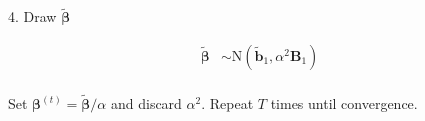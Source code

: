 \documentclass[11pt,a4paper]{article}
\begin{document}
\begin{center}
{\begin{minipage}{12cm}
4. Draw $\bm{\tilde{\beta}}$

\begin{equation*}
\begin{split}
	\bm{\tilde{\beta}} &\sim \mathrm{N}(\mathbf{\tilde{b}}_1, \alpha^2 \mathbf{B}_1 ) \\
\end{split}
\end{equation*}

Set $\bm{\beta}^{(t)} = \bm{\tilde{\beta}} / \alpha$ and discard $\alpha^2$. Repeat $T$ times until convergence. 
\end{minipage} } \end{center}

\newpage



\end{document}
